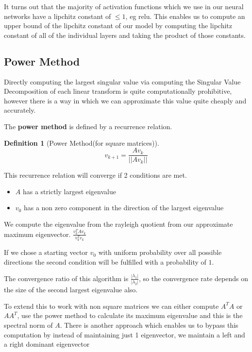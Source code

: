 \documentclass[12pt, a4paper]{report}
\theoremstyle{definition}
\theoremstyle{definition}
\newtheorem{definition}{Definition}[section]
\theoremstyle{definition}
\begin{document}
It turns out that the majority of activation functions which we use in our neural networks have a lipchitz constant of $\leq 1$, eg relu. This enables us to compute an upper bound of the lipchitz constant of our model by computing the lipchitz constant of all of the individual layers and taking the product of those constants.



\subsection{Power Method}

Directly computing the largest singular value via computing the Singular Value Decomposition of each linear transform is quite computationally prohibitive, however there is a way in which we can approximate this value quite cheaply and accurately.

The \textbf{power method} is defined by a recurrence relation.

\begin{definition}[Power Method(for square matrices)]
    $$v_{k+1} = \frac{Av_k}{||Av_k||} $$
\end{definition}

This recurrence relation will converge if 2 conditions are met.

\begin{itemize}
    \item $A$ has a strictly largest eigenvalue
    \item $v_0$ has a non zero component in the direction of the largest eigenvalue
\end{itemize}

We compute the eigenvalue from the rayleigh quotient from our approximate maximum eigenvector. $\frac{v_k^T A v_k}{v_k ^ T v_k}$

If we chose a starting vector $v_0$ with uniform probability over all possible directions the second condition will be fulfilled with a probability of $1$.

The convergence ratio of this algorithm is $\frac{|\lambda_1|}{|\lambda_2|}$, so the convergence rate depends on the size of the second largest eigenvalue also.


To extend this to work with non square matrices we can either compute $A^TA$ or $AA^T$, use the power method to calculate its maximum eigenvalue and this is the spectral norm of $A$.
There is another approach which enables us to bypass this computation by instead of maintaining just 1 eigenvector, we maintain a left and a right dominant eigenvector
\end{document}
